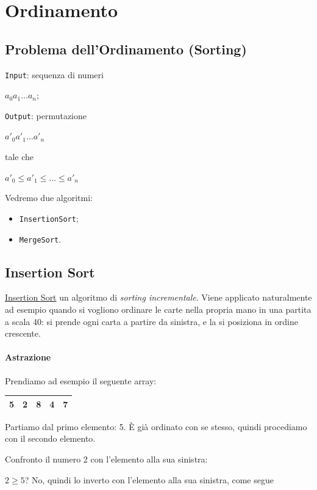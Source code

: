 \newpage
	
\section{Ordinamento}

\subsection{Problema dell'Ordinamento (Sorting)}
\texttt{Input}: sequenza di numeri 
\begin{center}
	$a_0 a_1 \dots a_n$;\par
\end{center}
\texttt{Output}: permutazione
\begin{center}
	$a'_0 a'_1 \dots a'_n$
\end{center}
tale che 
\begin{center}
	$a'_0 \leq a'_1 \leq \dots \leq a'_n$
\end{center}

\noindent Vedremo due algoritmi:
\begin{itemize}[noitemsep]
	\item \texttt{InsertionSort};
	\item \texttt{MergeSort}.
\end{itemize}

\subsection{Insertion Sort} \label{insertionsort}
\href{https://en.wikipedia.org/wiki/Insertion_sort}{Insertion Sort} un algoritmo di \emph{sorting incrementale}. Viene applicato naturalmente ad esempio quando si vogliono ordinare le carte nella propria mano in una partita a scala 40: si prende ogni carta a partire da sinistra, e la si posiziona in ordine crescente.\par
\paragraph{Astrazione} Prendiamo ad esempio il seguente array:

\begin{center}
	\begin{tabular}{|l|l|l|l|l|}
		\hline
		5 & 2 & 8 & 4 & 7 \\
		\hline
	\end{tabular}
\end{center}

\noindent Partiamo dal primo elemento: 5. È già ordinato con se stesso, quindi procediamo con il secondo elemento.\par
\noindent Confronto il numero 2 con l'elemento alla sua sinistra: \par
$2 \geq 5$?  No, quindi lo inverto con l'elemento alla sua sinistra, come segue

